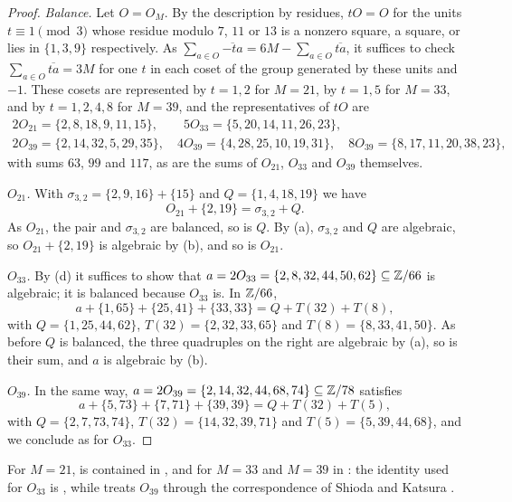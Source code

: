 \begin{proof}
\emph{Balance.} Let $O=O_{M}$. By the description by residues, $tO=O$ for
the units $t\equiv1\pmod3$ whose residue modulo $7$, $11$ or $13$ is a
nonzero square, a square, or lies in $\{1,3,9\}$ respectively. As
$\sum_{a\in O}\overline{-ta}=6M-\sum_{a\in O}\overline{ta}$, it suffices to
check $\sum_{a\in O}\overline{ta}=3M$ for one $t$ in each coset of the group
generated by these units and $-1$. These cosets are represented by $t=1,2$
for $M=21$, by $t=1,5$ for $M=33$, and by $t=1,2,4,8$ for $M=39$, and the
representatives of $tO$ are
\begin{gather*}
  2O_{21}=\{2,8,18,9,11,15\},\qquad 5O_{33}=\{5,20,14,11,26,23\},\\
  2O_{39}=\{2,14,32,5,29,35\},\quad 4O_{39}=\{4,28,25,10,19,31\},\quad
  8O_{39}=\{8,17,11,20,38,23\},
\end{gather*}
with sums $63$, $99$ and $117$, as are the sums of $O_{21}$, $O_{33}$ and
$O_{39}$ themselves.

\emph{$O_{21}$.} With $\sigma_{3,2}=\{2,9,16\}+\{15\}$ and $Q=\{1,4,18,19\}$
we have
\[
  O_{21}+\{2,19\}=\sigma_{3,2}+Q.
\]
As $O_{21}$, the pair and $\sigma_{3,2}$ are balanced, so is $Q$. By
(a), $\sigma_{3,2}$ and $Q$ are algebraic, so
$O_{21}+\{2,19\}$ is algebraic by (b), and so is
$O_{21}$.

\emph{$O_{33}$.} By (d) it suffices to show that
$a=2O_{33}=\{2,8,32,44,50,62\}\subseteq\mathbb{Z}/66$ is algebraic; it is balanced
because $O_{33}$ is. In $\mathbb{Z}/66$,
\[
  a+\{1,65\}+\{25,41\}+\{33,33\}=Q+T(32)+T(8),
\]
with $Q=\{1,25,44,62\}$, $T(32)=\{2,32,33,65\}$ and $T(8)=\{8,33,41,50\}$.
As before $Q$ is balanced, the three quadruples on the right are algebraic
by (a), so is their sum, and $a$ is algebraic by
(b).

\emph{$O_{39}$.} In the same way, $a=2O_{39}=\{2,14,32,44,68,74\}\subseteq
\mathbb{Z}/78$ satisfies
\[
  a+\{5,73\}+\{7,71\}+\{39,39\}=Q+T(32)+T(5),
\]
with $Q=\{2,7,73,74\}$, $T(32)=\{14,32,39,71\}$ and $T(5)=\{5,39,44,68\}$,
and we conclude as for $O_{33}$.
\end{proof}

For $M=21$,  is contained in \cite{daS21}, and for
$M=33$ and $M=39$ in \cite{Jum26}: the identity used for $O_{33}$ is
\cite[Theorem~1.4]{Jum26}, while \cite{Jum26} treats $O_{39}$ through the
correspondence of Shioda and Katsura \cite[Theorem~1.2]{Jum26}.

